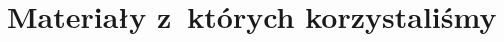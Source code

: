 \documentclass[10pt,t]{beamer}
\begin{document}























































\section{Materiały z~których korzystaliśmy}
\end{document}
